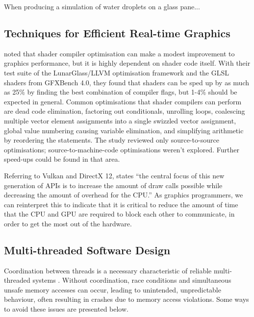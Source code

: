 \documentclass[11pt, a4paper, twocolumn]{article}
\begin{document}
When producing a simulation of water droplets on a glass pane... \citet{Chen2012}

\subsection{Techniques for Efficient Real-time Graphics}

\citet{Crawford2018} noted that shader compiler optimisation can make a modest improvement to graphics performance, but it is highly dependent on shader code itself. With their test suite of the LunarGlass/LLVM optimisation framework and the GLSL shaders from GFXBench 4.0, they found that shaders can be sped up by as much as 25\% by finding the best combination of compiler flags, but 1-4\% should be expected in general. Common optimisations that shader compilers can perform are dead code elimination, factoring out conditionals, unrolling loops, coalescing multiple vector element assignments into a single swizzled vector assignment, global value numbering causing variable elimination, and simplifying arithmetic by reordering the statements. The study reviewed only source-to-source optimisations; source-to-machine-code optimisations weren't explored. Further speed-ups could be found in that area.

Referring to Vulkan and DirectX 12, \citet{Joseph2016} states ``the central focus of this new generation of APIs is to increase the amount of draw calls possible while decreasing the amount of overhead for the CPU.'' As graphics programmers, we can reinterpret this to indicate that it is critical to reduce the amount of time that the CPU and GPU are required to block each other to communicate, in order to get the most out of the hardware.

\subsection{Multi-threaded Software Design}

Coordination between threads is a necessary characteristic of reliable multi-threaded systems \citep{Powell}. Without coordination, race conditions and simultaneous unsafe memory accesses can occur, leading to unintended, unpredictable behaviour, often resulting in crashes due to memory access violations. Some ways to avoid these issues are presented below.
\end{document}
